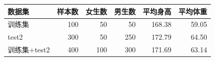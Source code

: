 \begin{tabular}{lrrrrr}
\toprule
数据集 & 样本数 & 女生数 & 男生数 & 平均身高 & 平均体重 \\
\midrule
训练集 & 100 & 50 & 50 & 168.38 & 59.05 \\
test2 & 300 & 50 & 250 & 172.79 & 64.50 \\
训练集+test2 & 400 & 100 & 300 & 171.69 & 63.14 \\
\bottomrule
\end{tabular}
